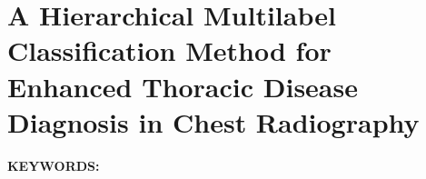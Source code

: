 \renewcommand{\chapterpath}[1]{Chapters/taxonomy/#1}
\renewcommand{\figurepath}[1]{Chapters/taxonomy/figures/#1}

\chapter{A Hierarchical Multilabel Classification Method for Enhanced Thoracic Disease Diagnosis in Chest Radiography}\label{ch:taxonomy}

%

\textbf{KEYWORDS:\;} %

\newpage



